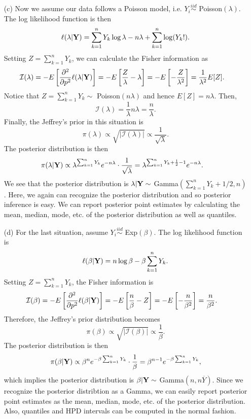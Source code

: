 \documentclass[11pt]{article}
\begin{document}
\begin{itemize}
\item[(c)]  Now we assume our data follows a Poisson model, i.e. $Y_i\overset{iid}{\sim}$ Poisson$(\lambda)$.  The log likelihood function is then
\[
\ell(\lambda | {\bf Y}) = \sum_{k=1}^n Y_k\log\lambda - n\lambda + \sum_{k=1}^n\log(Y_k!).
\]
Setting $Z=\sum_{k=1}^n Y_k$, we can calculate the Fisher information as
\begin{align*}
\mathcal{I}(\lambda) &= -E\left[\frac{\partial^2}{\partial p^2} \ell(\lambda|{\bf Y})\right] = -E\left[\frac{Z}{\lambda} - \lambda\right] = -E\left[-\frac{Z}{\lambda^2}\right] = \frac{1}{\lambda^2}E[Z].
\end{align*}
Notice that $Z=\sum_{k=1}^n Y_k\sim$ Poisson$(n\lambda)$ and hence $E[Z] = n\lambda$.  Then,
\[
\mathcal{I}(\lambda) = \frac{1}{\lambda}n\lambda = \frac{n}{\lambda}.
\]
Finally, the Jeffrey's prior in this situation is
\[
\pi(\lambda) \propto \sqrt{|\mathcal{I}(\lambda)|} \propto \frac{1}{\sqrt{\lambda}}.
\]
The posterior distribution is then
\begin{align*}
\pi(\lambda|{\bf Y}) &\propto \lambda^{\sum_{k=1}^n Y_k}e^{-n\lambda}\cdot\frac{1}{\sqrt{\lambda}} = \lambda^{\sum_{k=1}^nY_k + \frac{1}{2}-1}e^{-n\lambda}.
\end{align*}
We see that the posterior distribution is $\lambda|{\bf Y}\sim$ Gamma$\left(\sum_{k=1}^nY_k + 1/2, n\right)$.  Here, we again can recognize the posterior distribution and so posterior inference is easy.  We can report posterior point estimates by calculating the mean, median, mode, etc. of the posterior distribution as well as quantiles.


\item[(d)]  For the last situation, assume $Y_i\overset{iid}{\sim}$ Exp$(\beta)$.  The log likelihood function is
\[
\ell(\beta|{\bf Y}) = n\log \beta - \beta\sum_{k=1}^nY_k.
\]
Setting $Z = \sum_{k=1}^n Y_k$, the Fisher information is
\begin{align*}
\mathcal{I}(\beta) &= -E\left[\frac{\partial^2}{\partial p^2} \ell(\beta|{\bf Y})\right] = -E\left[\frac{n}{\beta} - Z\right] = -E\left[-\frac{n}{\beta^2}\right] = \frac{n}{\beta^2}.
\end{align*}
Therefore, the Jeffrey's prior distribution becomes
\[
\pi(\beta) \propto \sqrt{|\mathcal{I}(\beta)|} \propto \frac{1}{\beta}.
\]
The posterior distribution is then
\[
\pi(\beta|{\bf Y}) \propto \beta^ne^{-\beta\sum_{k=1}^nY_k}\cdot\frac{1}{\beta} = \beta^{n-1}e^{-\beta\sum_{k=1}^nY_k},
\]
which implies the posterior distribution is $\beta|{\bf Y}\sim$ Gamma$(n,n\overline{Y})$.  Since we recognize the posterior distribtion as a Gamma, we can easily report posterior point estimates as the mean, median, mode, etc. of the posterior distribution.  Also, quantiles and HPD intervals can be computed in the normal fashion.
\end{itemize}
\end{document}
